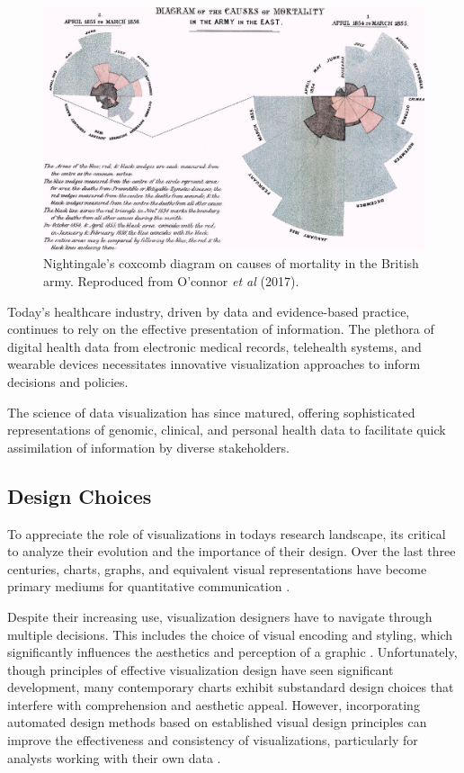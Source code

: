 \begin{figure}[ht]
  \centering
  \includegraphics[width=\textwidth]{media/fig20.jpeg}
  \caption{Nightingale's coxcomb diagram on causes of mortality in the British army. Reproduced from O'connor \textit{et al} (2017)\cite{soa7}.}
  \label{fig:coxcomb}
\end{figure}

Today's healthcare industry, driven by data and evidence-based practice, continues to rely on the effective presentation of information. The plethora of digital health data from electronic medical records, telehealth systems, and wearable devices necessitates innovative visualization approaches to inform decisions and policies.

The science of data visualization has since matured, offering sophisticated representations of genomic, clinical, and personal health data to facilitate quick assimilation of information by diverse stakeholders.

\subsection{Design Choices}\label{design-choices}

To appreciate the role of visualizations in today\textquotesingle s
research landscape, it\textquotesingle s critical to analyze their
evolution and the importance of their design. Over the last three
centuries, charts, graphs, and equivalent visual representations have
become primary mediums for quantitative communication
\cite{6}.

Despite their increasing use, visualization designers have to navigate
through multiple decisions. This includes the choice of visual encoding
and styling, which significantly influences the aesthetics and
perception of a graphic
\cite{7}. Unfortunately,
though principles of effective visualization design have seen
significant development, many contemporary charts exhibit substandard
design choices that interfere with comprehension and aesthetic appeal.
However, incorporating automated design methods based on established
visual design principles can improve the effectiveness and consistency
of visualizations, particularly for analysts working with their own data
\cite{8}.

